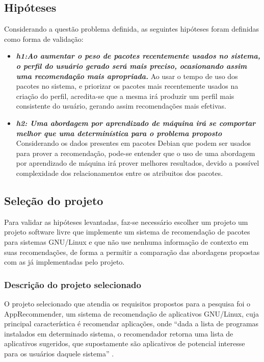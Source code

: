 \subsection{Hipóteses} \label{sec:hipoteses}

Considerando a questão problema definida, as seguintes hipóteses foram definidas
como forma de validação:

\begin{itemize} \item \textit{\textbf{h1:Ao aumentar o peso de pacotes
recentemente usados no sistema, o perfil do usuário gerado será mais preciso,
ocasionando assim uma recomendação mais apropriada.}} Ao usar o tempo de uso dos
pacotes no sistema, e priorizar os pacotes mais recentemente usados na criação
do perfil, acredita-se que a mesma irá produzir um perfil mais
consistente do usuário, gerando assim recomendações mais efetivas.\item
\textit{\textbf{h2: Uma abordagem por aprendizado de máquina irá se comportar melhor
que uma determinística para o problema proposto}}
Considerando os dados presentes em pacotes Debian que podem ser
usados para prover a recomendação, pode-se entender que o uso de uma abordagem
por aprendizado de máquina irá prover melhores resultados, devido a possível
complexidade dos relacionamentos entre os atribuitos dos pacotes.
\end{itemize}

\subsection{Seleção do projeto}

Para validar as hipóteses levantadas, faz-se necessário escolher um projeto
um projeto software livre que implemente um sistema de recomendação de pacotes
para sistemas GNU/Linux e que não use nenhuma informação de contexto em suas
recomendações, de forma a permitir a comparação das abordagens propostas com as
já implementadas pelo projeto.

\subsubsection{Descrição do projeto selecionado}

O projeto selecionado que atendia os requisitos propostos para a pesquisa foi o AppRecommender,
um sistema de recomendação de aplicativos GNU/Linux, cuja principal característica é recomendar aplicações,
onde “dada a lista de programas instalados em determinado sistema, o recomendador retorna uma lista de aplicativos
sugeridos, que supostamente são aplicativos de potencial interesse para os usuários daquele sistema”
\cite{araujo2011apprecommender}.

